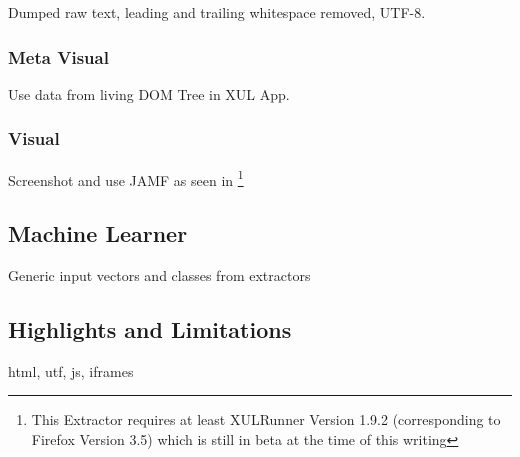 Dumped raw text, leading and trailing whitespace removed, UTF-8.

\subsubsection{Meta Visual}

Use data from living DOM Tree in XUL App.

\subsubsection{Visual}

Screenshot and use JAMF as seen in \cite{Steger08}
\footnote{This Extractor requires at least XULRunner Version 1.9.2 (corresponding to Firefox Version 3.5) which is still in beta at the time of this writing}

\subsection{Machine Learner}

Generic input vectors and classes from extractors

\subsection{\label{sec:limitations}Highlights and Limitations}

html, utf, js, iframes
